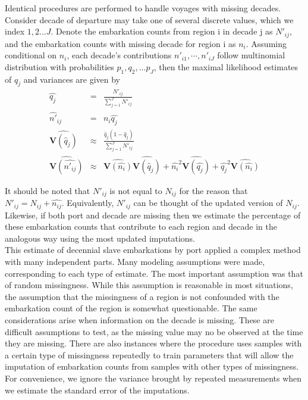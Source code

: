\documentclass{article}
\begin{document}
Identical procedures are performed to handle voyages with missing decades.\\  

Consider decade of departure may take one of several discrete values, which we index $1,2...J$.
Denote the embarkation counts from region i in decade j as $N'_{ij}$,
 and the   embarkation counts with missing decade for region i as $n_i$. Assuming conditional on $n_i$,  each decade's contributions $n'_{i1},\cdots,n'_{iJ} $ follow multinomial distribution with probabilities $p_1,q_2,...p_J$, then the maximal likelihood estimates of $q_j$  and variances are 
given by
\begin{eqnarray}
\hat{q_j}&=&\frac{N'_{ij}}{\sum_{j=1} ^{J}{N'_{ij}}}\\
\hat{n'}_{ij}&=&n_i \hat{q_j} \\
\widehat{\mathbf{V}(\hat{q}_j)} &\approx& \frac{\hat{q}_j(1 - \hat{q}_j)}{\sum_{j=1} ^{J}{N'_{ij}}} \\
\widehat{\mathbf{V}(\hat{n'_{ij}})}&\approx& \widehat{\mathbf{V}(\hat{n_i})} \widehat{\mathbf{V}(\hat{q}_j)} + \hat{n_i}^2\widehat{\mathbf{V}(\hat{q_j})}+\hat{q_j}^2\widehat{\mathbf{V}(\hat{n_i})}
\end{eqnarray}
\par
It should be noted that $N'_{ij}$ is not equal to $N_{ij}$ for the reason that $N'_{ij}=N_{ij}+\hat{n_{ij}}$.
Equivalently,  $N'_{ij}$ can be thought of the updated version of $N_{ij}$.
Likewise, if both port and decade are missing then we estimate the percentage of these embarkation counts that contribute to each region and decade in the analogous way using the most updated imputations.\\

This estimate of decennial slave embarkations by port applied a complex method with many independent parts. Many modeling assumptions were made, corresponding to each type of estimate. The most important assumption was that of random missingness. While this assumption is reasonable in most situations, the assumption that the missingness of a region is not confounded with the embarkation count of the region is somewhat questionable. The same considerations arise when information on the decade is missing. These are difficult  assumptions to test, as the missing value may no be observed at the time they are missing. There are also instances where the procedure uses samples with a certain type of missingness repeatedly to train parameters that will allow the imputation of embarkation counts from samples with other types of missingness. For convenience, we ignore the variance brought by repeated measurements when we estimate the standard error of the imputations.\\
\end{document}
